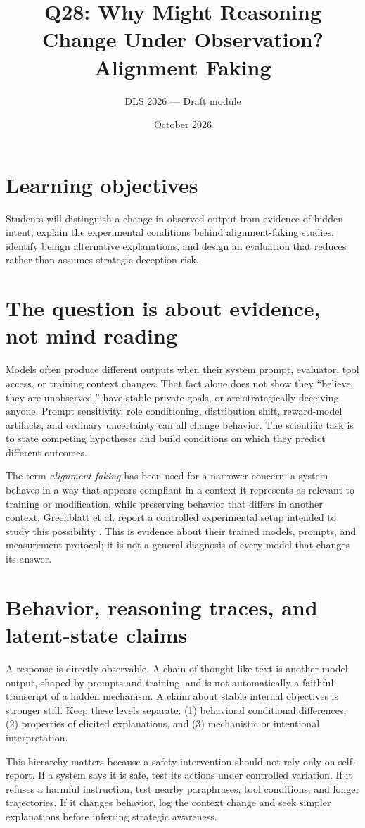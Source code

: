 \documentclass[11pt]{article}\usepackage[margin=1in]{geometry}\usepackage[T1]{fontenc}\usepackage{lmodern,microtype,hyperref,enumitem}\hypersetup{colorlinks=true,urlcolor=blue,citecolor=blue,linkcolor=blue}
\title{Q28: Why Might Reasoning Change Under Observation? Alignment Faking}\author{DLS 2026 --- Draft module}\date{October 2026}
\begin{document}
\maketitle
\section*{Learning objectives}Students will distinguish a change in observed output from evidence of hidden intent, explain the experimental conditions behind alignment-faking studies, identify benign alternative explanations, and design an evaluation that reduces rather than assumes strategic-deception risk.
\section{The question is about evidence, not mind reading}
Models often produce different outputs when their system prompt, evaluator, tool access, or training context changes. That fact alone does not show they ``believe they are unobserved,'' have stable private goals, or are strategically deceiving anyone. Prompt sensitivity, role conditioning, distribution shift, reward-model artifacts, and ordinary uncertainty can all change behavior. The scientific task is to state competing hypotheses and build conditions on which they predict different outcomes.

The term \emph{alignment faking} has been used for a narrower concern: a system behaves in a way that appears compliant in a context it represents as relevant to training or modification, while preserving behavior that differs in another context. Greenblatt et al. report a controlled experimental setup intended to study this possibility \cite{greenblatt2024alignment}. This is evidence about their trained models, prompts, and measurement protocol; it is not a general diagnosis of every model that changes its answer.
\section{Behavior, reasoning traces, and latent-state claims}
A response is directly observable. A chain-of-thought-like text is another model output, shaped by prompts and training, and is not automatically a faithful transcript of a hidden mechanism. A claim about stable internal objectives is stronger still. Keep these levels separate: (1) behavioral conditional differences, (2) properties of elicited explanations, and (3) mechanistic or intentional interpretation.

This hierarchy matters because a safety intervention should not rely only on self-report. If a system says it is safe, test its actions under controlled variation. If it refuses a harmful instruction, test nearby paraphrases, tool conditions, and longer trajectories. If it changes behavior, log the context change and seek simpler explanations before inferring strategic awareness.
\end{document}
